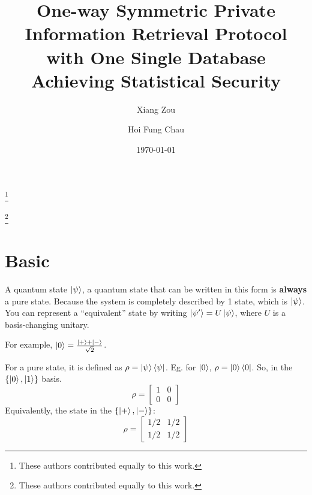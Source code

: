 \documentclass[%
 reprint,
superscriptaddress,
 amsmath,amssymb,
 aps,
]{revtex4-2}
\begin{document}

\title{One-way Symmetric Private Information Retrieval Protocol with One Single Database Achieving Statistical Security}%

\author{Xiang Zou}
\thanks{These authors contributed equally to this work.}
%

\author{Hoi Fung Chau}
\thanks{These authors contributed equally to this work.}
%



\date{\today}%

\maketitle

\section{Basic}

A quantum state $\ket{\psi}$, a quantum state that can be written in this form is \textbf{always} a pure state. Because the system is completely described by 1 state, which is $\ket{\psi}$. You can represent a ``equivalent'' state by writing $\ket{\psi'}=U\ket{\psi}$, where $U$ is a basis-changing unitary.

For example, $\ket{0}=\frac{\ket{+}+\ket{-}}{\sqrt{2}}$.

For a pure state, it is defined as $\rho =\ket{\psi}\bra{\psi}$. Eg. for $\ket{0}$, $\rho = \ket{0}\bra{0}$. So, in the $\{\ket{0}, \ket{1}\}$ basis.
\begin{equation}
    \rho = \begin{bmatrix}
        1 &0\\
        0&0
    \end{bmatrix}
\end{equation}
Equivalently, the state in the $\{\ket{+}, \ket{-}\}$:
\begin{equation}
    \rho = \begin{bmatrix}
        1/2 & 1/2\\
        1/2 & 1/2
    \end{bmatrix}
\end{equation}
\end{document}
